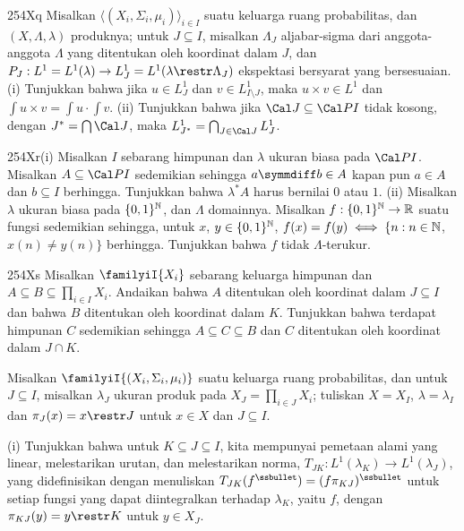 {\spheader 254Xq Misalkan $\langle(X_i,\Sigma_i,\mu_i)\rangle_{i\in I}$ suatu
keluarga ruang probabilitas, dan $(X,\Lambda,\lambda)$ produknya;
untuk $J\subseteq I$, misalkan $\Lambda_J$ aljabar-sigma dari anggota-anggota
$\Lambda$ yang ditentukan oleh koordinat dalam $J$, dan
$P_J:L^1=L^1(\lambda)\to L^1_J=L^1(\lambda\restr\Lambda_J)$ ekspektasi
bersyarat yang bersesuaian. (i) Tunjukkan bahwa jika $u\in L^1_J$
dan $v\in L^1_{I\setminus J}$, maka $u\times v\in L^1$ dan
$\int u\times v=\int u\cdot\int v$.
 (ii) Tunjukkan bahwa jika $\Cal J\subseteq\Cal PI$ tidak
kosong, dengan $J^*=\bigcap\Cal J$, maka
$L^1_{J^*}=\bigcap_{J\in\Cal J}L^1_J$.

\spheader 254Xr(i) Misalkan $I$ sebarang himpunan dan $\lambda$ ukuran biasa pada
$\Cal PI$. Misalkan $A\subseteq\Cal PI$ sedemikian sehingga $a\symmdiff b\in A$
kapan pun $a\in A$ dan $b\subseteq I$ berhingga. Tunjukkan bahwa $\lambda^*A$
harus bernilai $0$ atau $1$.
(ii) Misalkan $\lambda$ ukuran biasa pada $\{0,1\}^{\Bbb N}$, dan
$\Lambda$ domainnya. Misalkan $f:\{0,1\}^{\Bbb N}\to\Bbb R$ suatu fungsi
sedemikian sehingga, untuk $x$, $y\in\{0,1\}^{\Bbb N}$,
$f(x)=f(y)\iff\{n:n\in\Bbb N$, $x(n)\ne y(n)\}$ berhingga.
Tunjukkan bahwa $f$ tidak $\Lambda$-terukur.

\spheader 254Xs Misalkan $\familyiI{X_i}$ sebarang keluarga himpunan dan
$A\subseteq B\subseteq\prod_{i\in I}X_i$. Andaikan bahwa $A$
ditentukan oleh koordinat dalam $J\subseteq I$ dan bahwa $B$ ditentukan
oleh koordinat dalam $K$. Tunjukkan bahwa terdapat himpunan $C$ sedemikian sehingga
$A\subseteq C\subseteq B$ dan $C$ ditentukan oleh koordinat dalam
$J\cap K$.

Misalkan $\familyiI{(X_i,\Sigma_i,\mu_i)}$ suatu keluarga
ruang probabilitas, dan untuk $J\subseteq I$, misalkan $\lambda_J$ ukuran
produk
pada $X_J=\prod_{i\in J}X_i$; tuliskan $X=X_I$, $\lambda=\lambda_I$
dan $\pi_J(x)=x\restr J$ untuk $x\in X$ dan $J\subseteq I$.

\quad (i) Tunjukkan bahwa untuk $K\subseteq J\subseteq I$, kita mempunyai pemetaan alami
yang linear, melestarikan urutan, dan
melestarikan norma, $T_{JK}:L^1(\lambda_K)\to L^1(\lambda_J)$, yang didefinisikan dengan
menuliskan $T_{JK}(f^{\ssbullet})=(f\pi_{KJ})^{\ssbullet}$ untuk setiap fungsi yang
dapat diintegralkan terhadap $\lambda_K$, yaitu $f$, dengan $\pi_{KJ}(y)=y\restr K$ untuk
$y\in X_J$.

}
